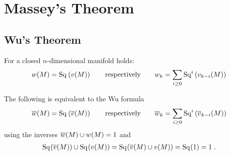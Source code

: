 % 

\chapter{Massey's Theorem}

\section{Wu's Theorem}
\begin{Thm}[Wu]\label{wu}
  For a closed $n$-dimensional manifold holds:
  \begin{gather*}
    w(M) = \mathrm{Sq}^{}\left(v(M)\right)
    \qquad\text{respectively}\qquad
    w_k = \sum_{i\geq0} \mathrm{Sq}^{i}\left(v_{k-i}(M)\right)
  \end{gather*}
\end{Thm}
\begin{Rem}
  The following is equivalent to the Wu formula
  \begin{gather*}
    \overline{w}(M) = \mathrm{Sq}^{}\left(\overline{v}(M)\right)
    \qquad\text{respectively}\qquad
    \overline{w}_k = \sum_{i\geq0} \mathrm{Sq}^{i}\left(\overline{v}_{k-i}(M)\right)
  \end{gather*}
  using the inverses $\overline{w}(M)\cup w(M) = 1$ and
  \begin{gather*}
    \mathrm{Sq}^{}(\overline{v}(M))\cup\mathrm{Sq}^{}(v(M))
    = \mathrm{Sq}^{}(\overline{v}(M)\cup v(M))
    = \mathrm{Sq}^{}(1)
    = 1
    \;.
  \end{gather*}
  
\end{Rem}




